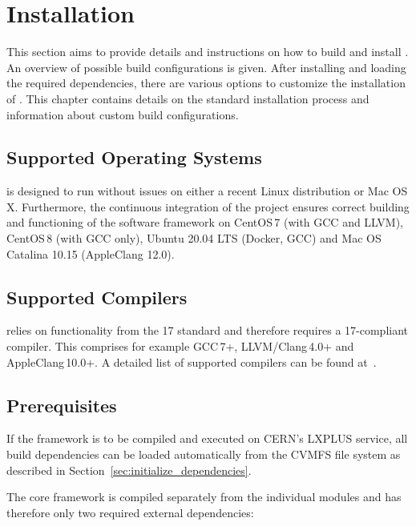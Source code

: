 \chapter{Installation}
\label{ch:installation}

This section aims to provide details and instructions on how to build and install \apsq.
An overview of possible build configurations is given.
After installing and loading the required dependencies, there are various options to customize the installation of \apsq.
This chapter contains details on the standard installation process and information about custom build configurations.


\section{Supported Operating Systems}
\label{sec:os}
\apsq is designed to run without issues on either a recent Linux distribution or Mac OS\,X.
Furthermore, the continuous integration of the project ensures correct building and functioning of the software framework on CentOS\,7 (with GCC and LLVM), CentOS\,8 (with GCC only), Ubuntu 20.04 LTS (Docker, GCC) and Mac OS Catalina 10.15 (AppleClang 12.0).

\section{Supported Compilers}
\label{sec:compilers}
\apsq relies on functionality from the {\CPP}17 standard and therefore requires a {\CPP}17-compliant compiler.
This comprises for example GCC\,7+, LLVM/Clang\,4.0+ and AppleClang\,10.0+. A detailed list of supported compilers can be found at~\cite{cppcompilersupport}.

\section{Prerequisites}
\label{sec:prerequisites}
If the framework is to be compiled and executed on CERN's LXPLUS service, all build dependencies can be loaded automatically from the CVMFS file system as described in Section~\ref{sec:initialize_dependencies}.

The core framework is compiled separately from the individual modules and \apsq has therefore only two required external dependencies:

